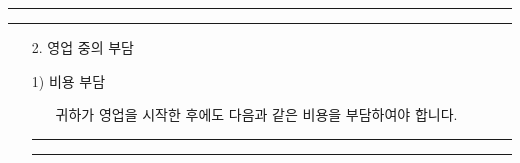 \documentclass[a5paper,10pt]{oblivoir}
\newcommand\crule[3][black]{\textcolor{#1}{\rule{#2}{#3}}}
\begin{document}
\newpage
\begin{center}
\crule[red]{4cm}{0.1cm} \crule[blue]{4cm}{0.1cm}
\end{center}
\begin{enumerate}
\item[2.] 영업 중의 부담
\end{enumerate}
\begin{enumerate}
\item[1)] 비용 부담
\begin{itemize}
\item[] 귀하가 영업을 시작한 후에도 다음과 같은 비용을 부담하여야 합니다.
\end{itemize}
\newpage
\begin{center}
\crule[red]{4cm}{0.1cm} \crule[blue]{4cm}{0.1cm}
\end{center}


\end{enumerate}
\end{document}
